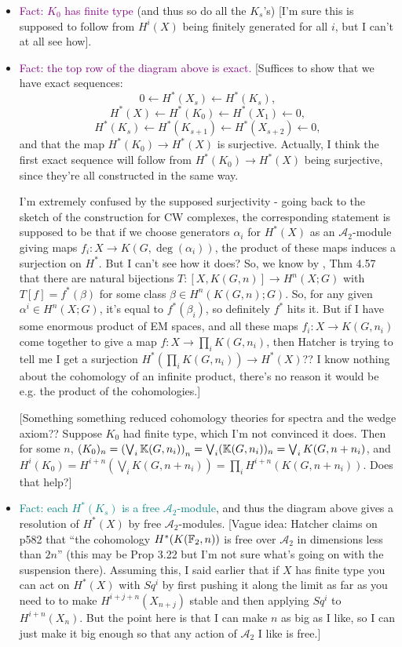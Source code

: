 \documentclass{MetricNotes2023}
\def\bb{\ensuremath\mathbb}
\def\A{\ensuremath{\mathscr{A}_2}}
\def\textcolour{\textcolor}
\begin{document}
\begin{itemize}
\item \textcolour{purple}{Fact: \(K_0\) has finite type} (and thus so do all the \(K_s\)'s) [I'm sure this is supposed to follow from \(H^i(X)\) being finitely generated for all \(i\), but I can't at all see how].
\item \textcolour{purple}{Fact: the top row of the diagram above is exact.} [Suffices to show that we have exact sequences: 
\[0 \leftarrow H^*(X_s)\leftarrow H^*(K_s),\]
\[H^*(X) \leftarrow H^*(K_0) \leftarrow H^*(X_1)\leftarrow 0,\]
\[H^*(K_s) \leftarrow H^*(K_{s+1}) \leftarrow H^*(X_{s+2})\leftarrow 0,\]
and that the map \(H^*(K_0)\to H^*(X)\) is surjective. Actually, I think the first exact sequence will follow from \(H^*(K_0)\to H^*(X)\) being surjective, since they're all constructed in the same way.

I'm extremely confused by the supposed surjectivity - going back to the sketch of the construction for CW complexes, the corresponding statement is supposed to be that if we choose generators \(\alpha_i\) for \(H^*(X)\) as an \(\A\)-module giving maps \(f_i : X \to K(G, \deg(\alpha_i))\), the product of these maps induces a surjection on \(H^*\). But I can't see how it does? So, we know by \autocite{hatcher}, Thm 4.57  that there are natural bijections \(T : [X, K(G,n)]\to H^n(X;G)\) with \(T[f]=f^*(\beta)\) for some class \(\beta \in H^n(K(G,n); G)\). So, for any given \(\alpha^i\in H^n(X;G)\), it's equal to \(f^*(\beta_i)\), so definitely \(f^*\) hits it. But if I have some enormous product of EM spaces, and all these maps \(f_i : X \to K(G, n_i)\) come together to give a map \(f : X \to \prod_i K(G,n_i)\), then Hatcher is trying to tell me I get a surjection \(H^*(\prod_i K(G, n_i))\to H^*(X)\)?? I know nothing about the cohomology of an infinite product, there's no reason it would be e.g. the product of the cohomologies.]

[Something something reduced cohomology theories for spectra and the wedge axiom?? Suppose \(K_0\) had finite type, which I'm not convinced it does. Then for some \(n\), \((K_0)_n=\left(\bigvee_i \bb{K}(G, n_i)\right)_n=\bigvee_i (\bb{K}(G, n_i))_n=\bigvee_i K(G, n+n_i)\), and \(H^i(K_0)=H^{i+n}(\bigvee_i K(G, n+n_i))=\prod_i H^{i+n}(K(G, n+n_i))\). Does that help?]

\item \textcolour{teal}{Fact: each \(H^*(K_s)\) is a free \(\A\)-module}, and thus the diagram above gives a resolution of \(H^*(X)\) by free \(\A\)-modules. [Vague idea: Hatcher claims on p582 that ``the cohomology \(H^*(K(\bb{F}_2,n))\) is free over \(\A\) in dimensions less than \(2n\)'' (this may be \autocite{ass} Prop 3.22 but I'm not sure what's going on with the suspension there). Assuming this, I said earlier that if \(X\) has finite type you can act on \(H^*(X)\) with \(Sq^i\) by first pushing it along the limit as far as you need to to make \(H^{i+j+n}(X_{n+j})\) stable and then applying \(Sq^i\) to \(H^{i+n}(X_n)\). But the point here is that I can make \(n\) as big as I like, so I can just make it big enough so that any action of \(\A\) I like is free.]
\end{itemize}
\end{document}
